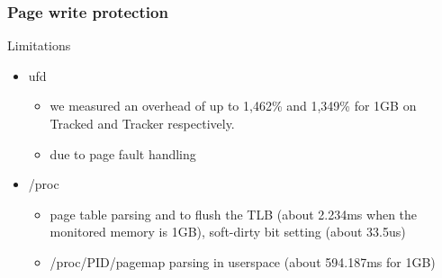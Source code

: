 \documentclass[xcolor=table,bigger,unknownkeysallowed]{beamer}
\begin{document}
        \begin{frame}
        \frametitle{Page write protection} 
			\begin{block}{Limitations}
				\begin{itemize}
					\item ufd 
					\begin{itemize}
						\item we measured an overhead of up to 1,462\% and 1,349\% for 1GB on Tracked and Tracker respectively.%
						\item due to page fault handling
					\end{itemize}
					\item /proc 
					\begin{itemize}
						\item page table parsing and to flush the TLB (about 2.234ms when the monitored memory is 1GB), soft-dirty bit setting (about 33.5us)
						\item /proc/PID/pagemap parsing in userspace (about 594.187ms for 1GB)						
					\end{itemize}					
				\end{itemize}
			\end{block}				
        \end{frame}                   
\end{document}
